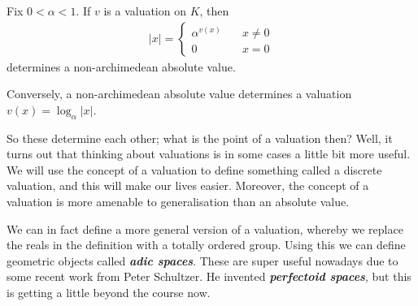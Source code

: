 \documentclass[]{article}
\theoremstyle{custhm}
\theoremstyle{cusdef}
\theoremstyle{custhm}
\theoremstyle{custhm}
\theoremstyle{custhm}
\theoremstyle{custhm}
\theoremstyle{cusdef}
\theoremstyle{remark}
\newcommand{\undf}[1]{\textit{\textbf{#1}}}
\begin{document}
Fix $0 < \alpha < 1$. If $v$ is a valuation on $K$, then
\begin{align*}
	|x| = \left\{ \begin{array}{cc}\alpha^{v(x)}\quad &x\ne 0\\ 0\quad&x=0\end{array}\right.
\end{align*}
determines a non-archimedean absolute value.

Conversely, a non-archimedean absolute value determines a valuation $v(x) = \log_\alpha|x|$.

So these determine each other; what is the point of a valuation then? Well, it turns out that thinking about valuations is in some cases a little bit more useful. We will use the concept of a valuation to define something called a discrete valuation, and this will make our lives easier. Moreover, the concept of a valuation is more amenable to generalisation than an absolute value.

We can in fact define a more general version of a valuation, whereby we replace the reals in the definition with a totally ordered group. Using this we can define geometric objects called \undf{adic spaces}. These are super useful nowadays due to some recent work from Peter Schultzer. He invented \undf{perfectoid spaces}, but this is getting a little beyond the course now.
\end{document}
